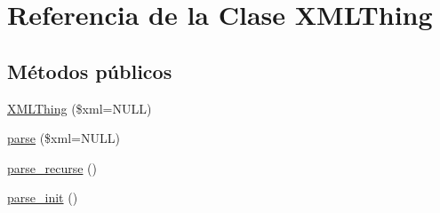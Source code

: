 \hypertarget{classXMLThing}{}\section{Referencia de la Clase X\+M\+L\+Thing}
\label{classXMLThing}
\subsection*{Métodos públicos}
\begin{DoxyCompactItemize}
\item 
\hyperlink{classXMLThing_a1c153caf15cb3b1a2159d5e879a3f6ca}{X\+M\+L\+Thing} (\$xml=N\+U\+LL)
\item 
\hyperlink{classXMLThing_a8d408058141c8a030b433b2deb822baf}{parse} (\$xml=N\+U\+LL)
\item 
\hyperlink{classXMLThing_ae18a74c5d5979c699b42b1f9a8fedbba}{parse\+\_\+recurse} ()
\item 
\hyperlink{classXMLThing_aa5d425088bd74ca4f3f9c1a9bc9ac453}{parse\+\_\+init} ()
\end{DoxyCompactItemize}
